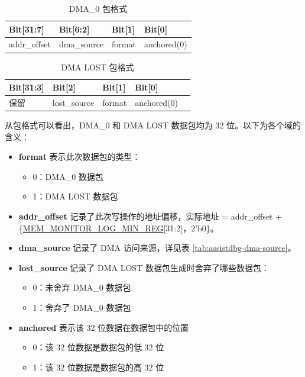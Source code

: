 \documentclass[main\_\_CN.tex]{subfiles}
\begin{document}
\begin{longtable}[c]{|L{3cm}|L{2cm}|L{2cm}|l|}
    \caption{DMA\_0 包格式}\label{tab:dbgassist-dma0-package}
    \\\hline
    \textbf{Bit[31:7]} & \textbf{Bit[6:2]} & \textbf{Bit[1]} & \textbf{Bit[0]} \\\hline
    addr\_offset & dma\_source & format & anchored(0)  \\\hline
\end{longtable}
    
\begin{longtable}[c]{|L{3cm}|L{3cm}|L{3cm}|L{3cm}|l|}
    \caption{DMA LOST 包格式}\label{tab:dbgassist-dma-lost-package}
    \\\hline
    \textbf{Bit[31:3]} & \textbf{Bit[2]} & \textbf{Bit[1]} & \textbf{Bit[0]} \\\hline
    保留 & lost\_source & format & anchored(0) \\\hline
\end{longtable}

从包格式可以看出，DMA\_0 和 DMA LOST 数据包均为 32 位。以下为各个域的含义：

\begin{itemize}
    \item \textbf{format} 表示此次数据包的类型：
    \begin{itemize}
        \item 0：DMA\_0 数据包
        \item 1：DMA LOST 数据包
    \end{itemize}
    \item \textbf{addr\_offset} 记录了此次写操作的地址偏移，实际地址 = addr\_offset + \{\hyperref[regdesc:MEMMONITORLOGMINREG]{MEM\_MONITOR\_LOG\_MIN\_REG}[31:2]，2'b0\}。
    \item \textbf{dma\_source} 记录了 DMA 访问来源，详见表 \ref{tab:assistdbg-dma-source}。
    \item \textbf{lost\_source} 记录了 DMA LOST 数据包生成时舍弃了哪些数据包：
    \begin{itemize}
        \item 0：未舍弃 DMA\_0 数据包
        \item 1：舍弃了 DMA\_0 数据包
    \end{itemize}
    \item \textbf{anchored} 表示该 32 位数据在数据包中的位置    \begin{itemize}
        \item 0：该 32 位数据是数据包的低 32 位
        \item 1：该 32 位数据是数据包的高 32 位
    \end{itemize}
\end{itemize}
\end{document}
